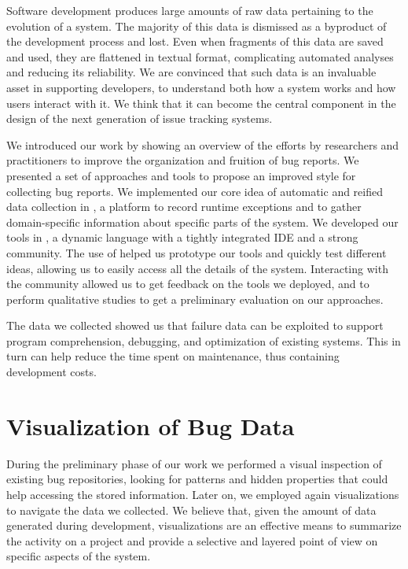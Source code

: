 


Software development produces large amounts of raw data pertaining to the evolution of a system.
The majority of this data is dismissed as a byproduct of the development process and lost.
Even when fragments of this data are saved and used, they are flattened in textual format, complicating automated analyses and reducing its reliability.
We are convinced that such data is an invaluable asset in supporting developers, to understand both how a system works and how users interact with it.
We think that it can become the central component in the design of the next generation of issue tracking systems.

We introduced our work by showing an overview of the efforts by researchers and practitioners to improve the organization and fruition of bug reports.
We presented a set of approaches and tools to propose an improved style for collecting bug reports.
We implemented our core idea of automatic and reified data collection in \sln, a platform to record runtime exceptions and to gather domain-specific information about specific parts of the system.
We developed our tools in \pha, a dynamic language with a tightly integrated IDE and a strong community.
The use of \pha helped us prototype our tools and quickly test different ideas, allowing us to easily access all the details of the system.
Interacting with the \pha community allowed us to get feedback on the tools we deployed, and to perform qualitative studies to get a preliminary evaluation on our approaches.

The data we collected showed us that failure data can be exploited to support program comprehension, debugging, and optimization of existing systems.
This in turn can help reduce the time spent on maintenance, thus containing development costs.


\section{Visualization of Bug Data}

During the preliminary phase of our work we performed a visual inspection of existing bug repositories, looking for patterns and hidden properties that could help accessing the stored information.
Later on, we employed again visualizations to navigate the data we collected.
We believe that, given the amount of data generated during development, visualizations are an effective means to summarize the activity on a project and provide a selective and layered point of view on specific aspects of the system.



